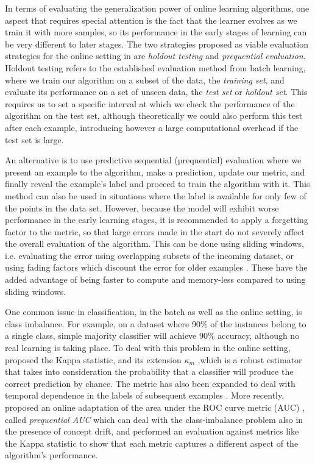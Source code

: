 In terms of evaluating the generalization power of online learning
algorithms, one aspect that requires special attention is the fact
that the learner evolves as we train it with more samples, so its
performance in the early stages of learning can be very different
to later stages. The two strategies proposed as viable evaluation strategies for the online
setting in \cite{online-evaluation-journal} are \emph{holdout testing}
and \emph{prequential evaluation}. Holdout testing refers to the
established evaluation method from batch learning, where we train
our algorithm on a subset of the data, the \emph{training set},
and evaluate its performance on a set of unseen data, the
\emph{test set} or \emph{holdout set}. This requires us to set a
specific interval at which we check the performance of the algorithm
on the test set, although theoretically we could also perform this
test after each example, introducing however a large computational overhead if
the test set is large.

An alternative is to use
predictive sequential (prequential) evaluation where we present
an example to the algorithm, make a prediction, update our metric,
and finally reveal the example's label and proceed to train the
algorithm with it. This method can also be used in situations
where the label is available for only few of the points in the
data set. However, because the model will exhibit worse performance
in the early learning stages, it is recommended to apply a forgetting
factor to the metric, so that large errors made in the start do
not severely affect the overall evaluation of the algorithm. This
can be done using sliding windows, i.e. evaluating the error using
overlapping subsets of the incoming dataset, or using fading
factors which discount the error for older examples \cite{online-evaluation-kdd}.
These have the added advantage of being faster to compute and memory-less
compared to using sliding windows.

One common issue in classification, in the batch as well as the online setting, is class
imbalance.
For example, on a dataset where 90\% of the instances belong to a single
class, simple majority classifier will achieve 90\% accuracy, although no
real learning is taking place.
To deal with this problem in the online setting, \citet{kappa-statistic}
proposed the Kappa statistic, and its extension $\kappa_m$ \cite{kappa-m},which is a robust estimator that takes into consideration
the probability that a classifier will produce the correct prediction by chance.
The metric has also been expanded to deal with temporal dependence
in the labels of subsequent examples \cite{temporal-dependence}.
More recently, \citet{prequential-auc} proposed an online adaptation
of the area under the ROC curve metric (AUC) \cite{auc}, called
\emph{prequential AUC} which can deal with the class-imbalance
problem also in the presence of concept drift, and performed
an evaluation against metrics like the Kappa statistic to show
that each metric captures a different aspect of the algorithm's performance.

